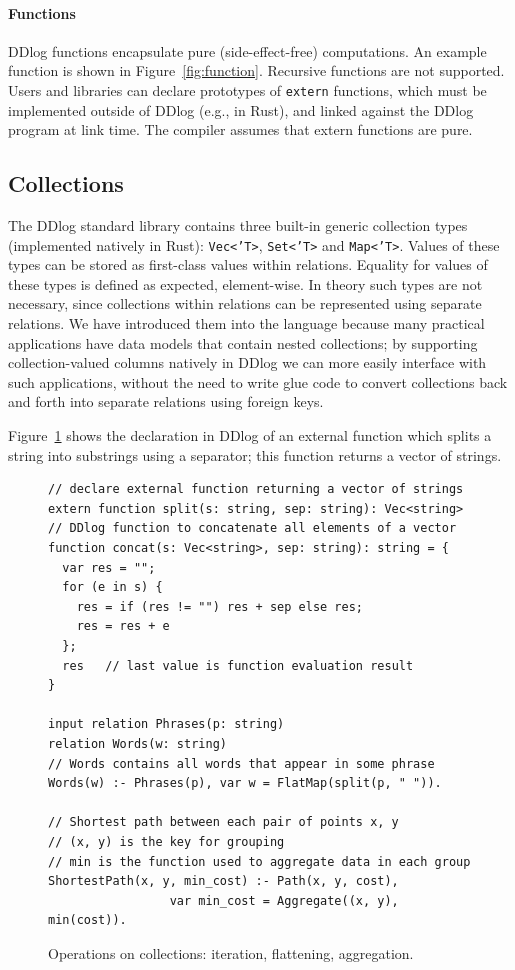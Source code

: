 \paragraph{Functions}

DDlog functions encapsulate pure (side-effect-free) computations.
An example function is shown in
Figure~\ref{fig:function}.  Recursive functions are not supported.
Users and libraries can declare prototypes of \texttt{extern}
functions, which must be implemented outside of DDlog (e.g., in Rust),
and linked against the DDlog program at link time.  The compiler
assumes that extern functions are pure.

\subsection{Collections}\label{sec:collections}

The DDlog standard library contains three built-in generic collection
types (implemented natively in Rust): \texttt{Vec<'T>},
\texttt{Set<'T>} and \texttt{Map<'T>}.  Values of these types can be
stored as first-class values within relations.  Equality for values
of these types is defined as expected, element-wise.  In theory such
types are not necessary, since collections within relations can be
represented using separate relations.  We have
introduced them into the language because many practical applications
have data models that contain nested collections; by supporting
collection-valued columns natively in DDlog we can more easily
interface with such applications, without the need to write glue code
to convert collections back and forth into separate relations using
foreign keys.

Figure~\ref{fig:collections} shows the declaration in DDlog of an
external function which splits a string into substrings using a
separator; this function returns a vector of strings.

\begin{figure}[t]
  \footnotesize
  \begin{lstlisting}[language=ddlog]
// declare external function returning a vector of strings
extern function split(s: string, sep: string): Vec<string>
// DDlog function to concatenate all elements of a vector
function concat(s: Vec<string>, sep: string): string = {
  var res = "";
  for (e in s) {
    res = if (res != "") res + sep else res;
    res = res + e
  };
  res   // last value is function evaluation result
}

input relation Phrases(p: string)
relation Words(w: string)
// Words contains all words that appear in some phrase
Words(w) :- Phrases(p), var w = FlatMap(split(p, " ")).

// Shortest path between each pair of points x, y
// (x, y) is the key for grouping
// min is the function used to aggregate data in each group
ShortestPath(x, y, min_cost) :- Path(x, y, cost),
                 var min_cost = Aggregate((x, y), min(cost)).
\end{lstlisting}
\caption{Operations on collections: iteration, flattening,
  aggregation.\label{fig:collections}}
\end{figure}

